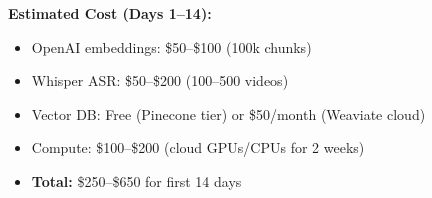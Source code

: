 \documentclass[11pt,letterpaper]{article}
\begin{document}
\textbf{Estimated Cost (Days 1--14):}
\begin{itemize}
\item OpenAI embeddings: \$50--\$100 (100k chunks)
\item Whisper ASR: \$50--\$200 (100--500 videos)
\item Vector DB: Free (Pinecone tier) or \$50/month (Weaviate cloud)
\item Compute: \$100--\$200 (cloud GPUs/CPUs for 2 weeks)
\item \textbf{Total:} \$250--\$650 for first 14 days
\end{itemize}
\end{document}
